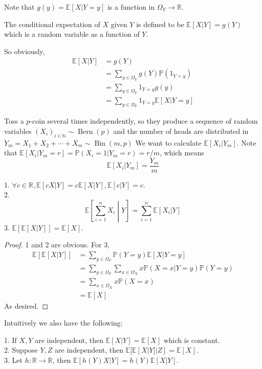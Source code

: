 Note that $g(y)=\mathbb E[X|Y=y]$ is a function in $\Omega_Y\to\mathbb R$.
\begin{definition}
    The conditional expectation of $X$ given $Y$ is defined to be $\mathbb E[X|Y]=g(Y)$ which is a random variable as a function of $Y$.
\end{definition}
So obviously,
\begin{align*}
    \mathbb E[X|Y]&=g(Y)\\
    &=\sum_{y\in\Omega_Y}g(Y)\mathbb P(1_{Y=y})\\
    &=\sum_{y\in\Omega_Y}1_{Y=y}g(y)\\
    &=\sum_{y\in\Omega_Y}1_{Y=y}\mathbb E[X|Y=y]
\end{align*}
\begin{example}
    Toss a $p$-coin several times independently, so they produce a sequence of random variables $(X_i)_{i\in\mathbb N}\sim\operatorname{Bern}(p)$ and the number of heads are distributed in $Y_m=X_1+X_2+\cdots+X_m\sim\operatorname{Bin}(m,p)$
    We want to calculate $\mathbb E[X_i|Y_m]$.
    Note that $\mathbb E[X_i|Y_m=r]=\mathbb P(X_i=1|Y_m=r)=r/m$, which means
    $$\mathbb E[X_i|Y_m]=\frac{Y_m}{m}$$
\end{example}
\begin{proposition}
    1. $\forall c\in\mathbb R,\mathbb E[cX|Y]=c\mathbb E[X|Y],\mathbb E[c|Y]=c$.\\
    2.
    $$\mathbb E\left[\sum_{i=1}^nX_i\middle|Y\right]=\sum_{i=1}^n\mathbb E[X_i|Y]$$
    3. $\mathbb E[\mathbb E[X|Y]]=\mathbb E[X]$.
\end{proposition}
\begin{proof}
    1 and 2 are obvious.
    For 3,
    \begin{align*}
        \mathbb E[\mathbb E[X|Y]]&=\sum_{y\in\Omega_Y}\mathbb P(Y=y)\mathbb E[X|Y=y]\\
        &=\sum_{y\in\Omega_Y}\sum_{x\in\Omega_X}x\mathbb P(X=x|Y=y)\mathbb P(Y=y)\\
        &=\sum_{x\in\Omega_X}x\mathbb P(X=x)\\
        &=\mathbb E[X]
    \end{align*}
    As desired.
\end{proof}
Intuitively we also have the following:
\begin{proposition}\label{conditional_exp}
    1. If $X,Y$ are independent, then $\mathbb E[X|Y]=\mathbb E[X]$ which is constant.\\
    2. Suppose $Y,Z$ are independent, then $\mathbb E[\mathbb E[X|Y]|Z]=\mathbb E[X]$.\\
    3. Let $h:\mathbb R\to\mathbb R$, then $\mathbb E[h(Y)X|Y]=h(Y)\mathbb E[X|Y]$.
\end{proposition}
